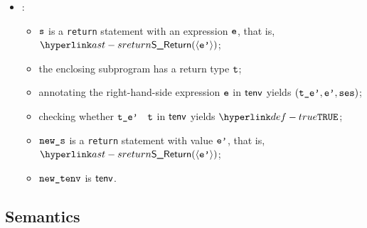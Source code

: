\begin{itemize}
  \item {}:
  \begin{itemize}
    \item $\vs$ is a \texttt{return} statement with an expression $\ve$, that is, $\SReturn(\langle \vep \rangle)$;
    \item the enclosing subprogram has a return type $\vt$;
    \item annotating the right-hand-side expression $\ve$ in $\tenv$ yields $(\tep,\vep,\vses)$\ProseOrTypeError;
    \item checking whether $\vtep$ \typesatisfies\ $\vt$ in $\tenv$ yields $\True$\ProseOrTypeError;
    \item $\news$ is a \texttt{return} statement with value $\vep$, that is, $\SReturn(\langle \vep \rangle)$;
    \item $\newtenv$ is $\tenv$.
  \end{itemize}
\end{itemize}
\FormallyParagraph
\begin{mathpar}
\end{mathpar}

\begin{mathpar}
\end{mathpar}

\begin{mathpar}
\end{mathpar}

\subsection{Semantics}
